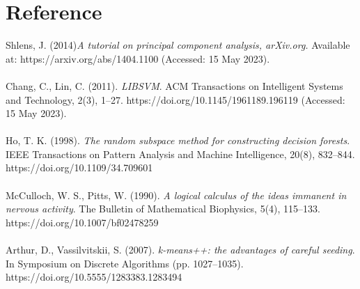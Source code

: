 \documentclass[10pt,twocolumn]{article}
\begin{document}
	\section{Reference}
	Shlens, J. (2014)\textit{A tutorial on principal component analysis, arXiv.org.} Available at: https://arxiv.org/abs/1404.1100
	(Accessed: 15 May 2023). 
	\\ \hspace*{\fill} \\
	Chang, C., Lin, C. (2011). \textit{LIBSVM}. ACM Transactions on Intelligent Systems and Technology, 2(3), 1–27. https://doi.org/10.1145/1961189.196119
	(Accessed: 15 May 2023). 
	\\ \hspace*{\fill} \\
	Ho, T. K. (1998). \textit{The random subspace method for constructing decision forests}. IEEE Transactions on Pattern Analysis and Machine Intelligence, 20(8), 832–844. https://doi.org/10.1109/34.709601
	\\ \hspace*{\fill} \\
	McCulloch, W. S., Pitts, W. (1990). \textit{A logical calculus of the ideas immanent in nervous activity}. The Bulletin of Mathematical Biophysics, 5(4), 115–133. https://doi.org/10.1007/bf02478259
	\\ \hspace*{\fill} \\
	Arthur, D., Vassilvitskii, S. (2007).\textit{ k-means++: the advantages of careful seeding}. In Symposium on Discrete Algorithms (pp. 1027–1035). https://doi.org/10.5555/1283383.1283494
	
	
\end{document}
